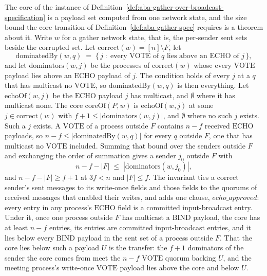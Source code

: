 \begin{definition}
  \label{def:aba-gather-core}
  \leanok
  The core of the instance of Definition~\ref{def:aba-gather-over-broadcast-specification} is a payload set computed from one network state, and the size bound the core transition of Definition~\ref{def:aba-gather-spec} requires is a theorem about it.
  Write $w$ for a gather network state, that is, the per-sender sent sets beside the corrupted set.
  Let $\mathrm{correct}(w) = [n] \setminus F$, let
  \[
    \mathrm{dominatedBy}(w, q) \;=\;
      \{\, j \;:\; \text{every } \mathrm{VOTE} \text{ of } q
      \text{ lies above an } \mathrm{ECHO} \text{ of } j \,\},
  \]
  and let $\mathrm{dominators}(w, j)$ be the processes of $\mathrm{correct}(w)$ whose every $\mathrm{VOTE}$ payload lies above an $\mathrm{ECHO}$ payload of $j$.
  The condition holds of every $j$ at a $q$ that has multicast no $\mathrm{VOTE}$, so $\mathrm{dominatedBy}(w, q)$ is then everything.
  Let $\mathrm{echoOf}(w, j)$ be the $\mathrm{ECHO}$ payload $j$ has multicast, and $\emptyset$ where it has multicast none.
  The core $\mathrm{coreOf}(P, w)$ is $\mathrm{echoOf}(w, j)$ at some $j \in \mathrm{correct}(w)$ with $f + 1 \le |\mathrm{dominators}(w, j)|$, and $\emptyset$ where no such $j$ exists.
  Such a $j$ exists.
  A $\mathrm{VOTE}$ of a process outside $F$ contains $n - f$ received $\mathrm{ECHO}$ payloads, so $n - f \le |\mathrm{dominatedBy}(w, q)|$ for every $q$ outside $F$, one that has multicast no $\mathrm{VOTE}$ included.
  Summing that bound over the senders outside $F$ and exchanging the order of summation gives a sender $j_0$ outside $F$ with
  \[
    n - f - |F| \;\le\; |\mathrm{dominators}(w, j_0)|,
  \]
  and $n - f - |F| \ge f + 1$ at $3f < n$ and $|F| \le f$.
  The invariant  ties a correct sender's sent messages to its write-once fields and those fields to the quorums of received messages that enabled their writes, and adds one clause, $echo\_approved$: every entry in any process's $\mathrm{ECHO}$ field is a committed input-broadcast entry.
  Under it, once one process outside $F$ has multicast a $\mathrm{BIND}$ payload, the core has at least $n - f$ entries, its entries are committed input-broadcast entries, and it lies below every $\mathrm{BIND}$ payload in the sent set of a process outside $F$.\leanok{} That the core lies below such a payload $U$ is the transfer: the $f{+}1$ dominators of the sender the core comes from meet the $n - f$ $\mathrm{VOTE}$ quorum backing $U$, and the meeting process's write-once $\mathrm{VOTE}$ payload lies above the core and below $U$.

\end{definition}
